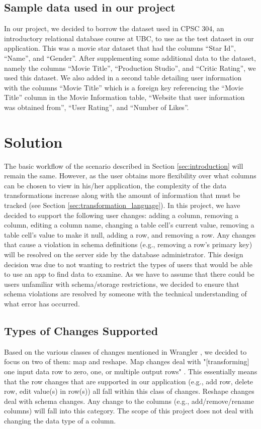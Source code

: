 \documentclass[12pt]{article}
\begin{document}
\subsection{Sample data used in our project}
In our project, we decided to borrow the dataset used in CPSC 304, an introductory relational database course at UBC, to use as the test dataset in our application. This was a movie star dataset that had the columns ``Star Id'', ``Name'', and ``Gender''. After supplementing some additional data to the dataset, namely the columns ``Movie Title'', ``Production Studio'', and ``Critic Rating'', we used this dataset. We also added in a second table detailing user information with the columns ``Movie Title'' which is a foreign key referencing the ``Movie Title'' column in the Movie Information table, ``Website that user information was obtained from'', ``User Rating'', and ``Number of Likes''.

\section{Solution}
The basic workflow of the scenario described in Section \ref{sec:introduction} will remain the same. However, as the user obtains more flexibility over what columns can be chosen to view in his/her application,  the complexity of the data transformations increase along with the amount of information that must be tracked (see Section \ref{sec:transformation_language}). In this project, we have decided to support the following user changes: adding a column, removing a column, editing a column name, changing a table cell's current value, removing a table cell's value to make it null, adding a row, and removing a row. Any changes that cause a violation in schema definitions (e.g., removing a row's primary key) will be resolved on the server side by the database administrator. This design decision was due to not wanting to restrict the types of users that would be able to use an app to find data to examine. As we have to assume that there could be users unfamiliar with schema/storage restrictions, we decided to ensure that schema violations are resolved by someone with the technical understanding of what error has occurred. 

\subsection{Types of Changes Supported}
Based on the various classes of changes mentioned in Wrangler \cite{kandel2011wrangler}, we decided to focus on two of them: map and reshape. Map changes deal with "[transforming] one input data row to zero, one, or multiple output rows" \cite{kandel2011wrangler}. This essentially means that the row changes that are supported in our application (e.g., add row, delete row, edit value(s) in row(s)) all fall within this class of changes. Reshape changes deal with schema changes. Any change to the columns (e.g., add/remove/rename columns) will fall into this category. The scope of this project does not deal with changing the data type of a column.
\end{document}
